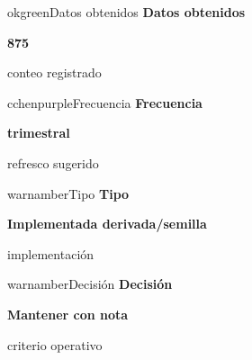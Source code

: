 \documentclass[9pt,a4paper]{extarticle}
\begin{document}
\vspace{0.04cm}
\begin{minipage}{0.24\textwidth}
\begin{metricbox}{okgreen}{Datos obtenidos}
{\large\bfseries Datos obtenidos}\par
{\Large\bfseries 875}\par
{\normalsize conteo registrado}
\end{metricbox}
\end{minipage}\hfill
\begin{minipage}{0.24\textwidth}
\begin{metricbox}{cchenpurple}{Frecuencia}
{\large\bfseries Frecuencia}\par
{\large\bfseries trimestral}\par
{\normalsize refresco sugerido}
\end{metricbox}
\end{minipage}\hfill
\begin{minipage}{0.24\textwidth}
\begin{metricbox}{warnamber}{Tipo}
{\large\bfseries Tipo}\par
{\normalsize\bfseries Implementada derivada/semilla}\par
{\normalsize implementación}
\end{metricbox}
\end{minipage}\hfill
\begin{minipage}{0.24\textwidth}
\begin{metricbox}{warnamber}{Decisión}
{\large\bfseries Decisión}\par
{\normalsize\bfseries Mantener con nota}\par
{\normalsize criterio operativo}
\end{metricbox}
\end{minipage}
\end{document}
